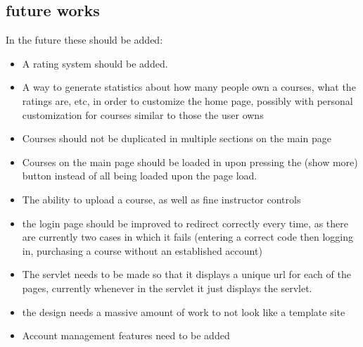 \documentclass{article}
\begin{document}
\subsection{future works}
In the future these should be added:
\begin{itemize}
    \item A rating system should be added.
    \item A way to generate statistics about how many people own a courses, what the ratings are, etc, in order to customize the home page, possibly with personal customization for courses similar to those the user owns
    \item Courses should not be duplicated in multiple sections on the main page 
    \item Courses on the main page should be loaded in upon pressing the (show more) button instead of all being loaded upon the page load.
    \item The ability to upload a course, as well as fine instructor controls
    \item the login page should be improved to redirect correctly every time, as there are currently two cases in which it fails (entering a correct code then logging in, purchasing a course without an established account)
    \item The servlet needs to be made so that it displays a unique url for each of the pages, currently whenever in the servlet it just displays the servlet.
    \item the design needs a massive amount of work to not look like a template site
    \item Account management features need to be added
\end{itemize}
\end{document}
